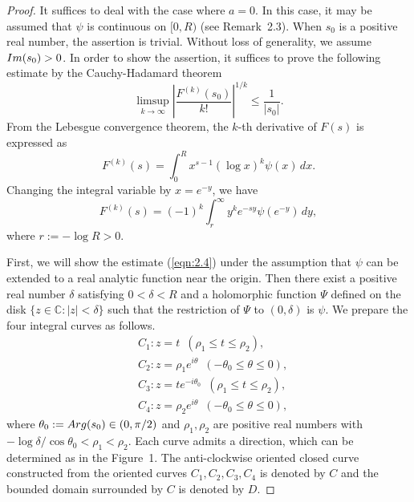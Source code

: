 \documentclass[10pt,a4paper]{amsart}
\numberwithin{equation}{section}
\newcommand{\C}{{\mathbb C}}
\newcommand{\1}{{\bf 1}}
\begin{document}
\begin{proof}
It suffices to deal with 
the case where $a=0$.   
In this case, it may be assumed that 
$\psi$ is continuous on $[0,R)$ 
(see Remark~2.3). 
When $s_0$ is a positive real number, 
the assertion is trivial.
Without loss of generality, 
we assume ${\rm Im}(s_{0})>0$. 
In order to show the assertion, 
it suffices to prove the following estimate 
by the Cauchy-Hadamard theorem
\begin{equation}\label{eqn:2.4}
\limsup_{k \to \infty}
\left| \frac{F^{(k)}(s_0)}{k!} \right|^{1/k} 
\le \frac{1}{|s_0|}.
\end{equation}
From the Lebesgue convergence theorem,
the $k$-th derivative of $F(s)$ is expressed as
\begin{equation}\label{eqn:2.5}
F^{(k)}(s)
=\int_0^R x^{s-1}(\log x)^k\psi(x)\,dx.
\end{equation}
Changing the integral variable by $x=e^{-y}$,
we have 
\begin{equation}\label{eqn:2.6}
F^{(k)}(s)
=(-1)^k\int_r^{\infty} y^k e^{-sy}\psi(e^{-y})\,dy,
\end{equation}
where $r:=-\log R>0$.

First, we will show the estimate (\ref{eqn:2.4}) 
under the assumption that  
$\psi$ can be extended to a real analytic function 
near the origin.
Then there exist a positive real number $\delta$ 
satisfying $0<\delta<R$
and
a holomorphic function $\Psi$ defined on the disk 
$\{ z \in \C : |z|<\delta \}$
such that 
the restriction of $\Psi$ 
to $(0,\delta)$ is $\psi$.
We prepare the four integral curves as follows.
\begin{equation*}\label{eqn:}
\begin{split}
&C_1 : z=t \,\,\, 
(\rho_1 \le t \le \rho_2), \\
&C_2 : z=\rho_1 e^{i\theta} \,\,\, 
(-\theta_0 \le \theta \le 0), \\
&C_3 : z=te^{-i\theta_0} \,\,\, 
(\rho_1 \le t \le \rho_2), \\
&C_4 : z=\rho_2 e^{i\theta} \,\,\, 
(-\theta_0 \le \theta \le 0),  
\end{split}
\end{equation*}
where $\theta_0:={\rm Arg}(s_0) \in (0,\pi/2)$
and $\rho_1, \rho_2$ are positive real numbers with 
$-\log \delta/\cos \theta_0<\rho_1<\rho_2$.
Each curve admits a direction,
which can be determined as in the Figure~1.
The anti-clockwise oriented closed curve 
constructed from the oriented curves 
$C_1, C_2, C_3, C_4$ is denoted by $C$
and 
the bounded domain surrounded 
by $C$ is denoted by $D$.


\end{proof}
\end{document}
